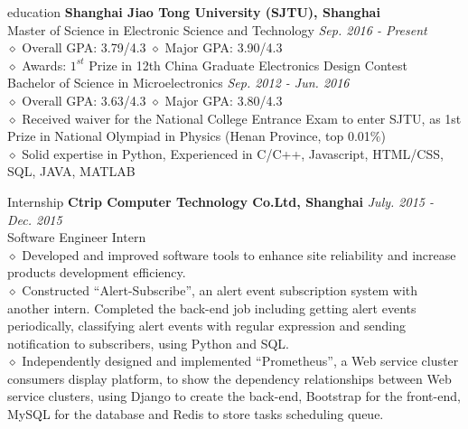 \documentclass{resume} %
\begin{document}

\begin{rSection}{education}
\textbf{Shanghai Jiao Tong University (SJTU), Shanghai}
\\Master of Science in Electronic Science and Technology \hfill \emph{Sep. 2016 - Present}
\\$\diamond$ Overall GPA: 3.79/4.3 \qquad  \qquad \qquad $\diamond$ Major GPA: 3.90/4.3
\\$\diamond$ Awards: $1^{st}$ Prize in 12th China Graduate Electronics Design Contest
\\Bachelor of Science in Microelectronics \hfill \emph{Sep. 2012 - Jun. 2016}
\\$\diamond$ Overall GPA: 3.63/4.3  \qquad  \qquad \qquad $\diamond$ Major GPA: 3.80/4.3
\\$\diamond$ Received waiver for the National College Entrance Exam to enter SJTU, as 1st Prize in National Olympiad in Physics (Henan Province, top 0.01$\%$)
\\$\diamond$ Solid expertise in Python, Experienced in C/C++, Javascript, HTML/CSS, SQL, JAVA, MATLAB
\end{rSection}


\begin{rSection}{Internship}
\textbf{Ctrip Computer Technology Co.Ltd, Shanghai} \hfill \emph{July. 2015 - Dec. 2015}
\\Software Engineer Intern
\\$\diamond$ Developed and improved software tools to enhance site reliability and increase products development efficiency.
\\$\diamond$ Constructed ``Alert-Subscribe'', an alert event subscription system with another intern. Completed the back-end job including getting alert events periodically, classifying alert events with regular expression and sending notification to subscribers, using Python and SQL.
\\$\diamond$ Independently designed and implemented ``Prometheus'', a Web service cluster consumers display platform, to show the dependency relationships between Web service clusters, using Django to create the back-end, Bootstrap for the front-end, MySQL for the database and Redis to store tasks scheduling queue.
\end{rSection}
\end{document}
